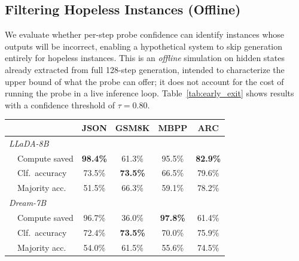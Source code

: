 \documentclass[11pt]{article}
\makeatletter
\providecommand{\linenumbers}{}
\providecommand{\nolinenumbers}{}
\let\old@table\table
\let\old@endtable\endtable
\renewenvironment{table}[1][]{%
  \nolinenumbers\old@table[#1]%
}{%
  \old@endtable\linenumbers%
}
\makeatother
\begin{document}
\subsection{Filtering Hopeless Instances (Offline)}
\label{sec:selective_gen}

We evaluate whether per-step probe confidence can identify instances whose outputs will be incorrect, enabling a hypothetical system to skip generation entirely for hopeless instances.
This is an \emph{offline} simulation on hidden states already extracted from full 128-step generation, intended to characterize the upper bound of what the probe can offer; it does not account for the cost of running the probe in a live inference loop.
Table~\ref{tab:early_exit} shows results with a confidence threshold of $\tau = 0.80$.

\begin{table}[t]
  \centering
  \small
  \setlength{\tabcolsep}{4pt}
  \begin{tabular}{lcccc}
    \toprule
    & \textbf{JSON} & \textbf{GSM8K} & \textbf{MBPP} & \textbf{ARC} \\
    \midrule
    \multicolumn{5}{l}{\textit{LLaDA-8B}} \\
    ~~Compute saved & \textbf{98.4\%} & 61.3\% & 95.5\% & \textbf{82.9\%} \\
    ~~Clf.\ accuracy & 73.5\% & \textbf{73.5\%} & 66.5\% & 79.6\% \\
    ~~Majority acc.\ & 51.5\% & 66.3\% & 59.1\% & 78.2\% \\
    \midrule
    \multicolumn{5}{l}{\textit{Dream-7B}} \\
    ~~Compute saved & 96.7\% & 36.0\% & \textbf{97.8\%} & 61.4\% \\
    ~~Clf.\ accuracy & 72.4\% & \textbf{73.5\%} & 70.0\% & 75.9\% \\
    ~~Majority acc.\ & 54.0\% & 61.5\% & 55.6\% & 74.5\% \\
    \bottomrule
  \end{tabular}
  \caption{Filtering simulation ($\tau = 0.80$). \emph{Compute saved}: fraction of denoising steps avoided by skipping instances the probe predicts will fail (no output is produced for skipped instances). \emph{Clf.\ accuracy}: fraction of instances for which the probe correctly predicts functional vs.\ non-functional. \emph{Majority acc.}: trivial baseline that always predicts the majority class. Lift over majority is large for JSON ($+19$--$22\%$) and MBPP ($+7$--$15\%$) but only marginal for ARC ($+1.4\%$ on Dream).}
  \label{tab:early_exit}
\end{table}
\end{document}
